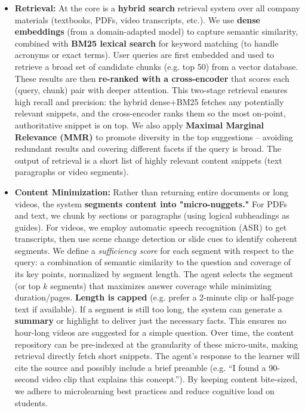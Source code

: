 \documentclass[11pt]{article}
\begin{document}
\begin{itemize}
  \item \textbf{Retrieval:} At the core is a \textbf{hybrid search} retrieval system over all company materials (textbooks, PDFs, video transcripts, etc.). We use \textbf{dense embeddings} (from a domain-adapted model) to capture semantic similarity, combined with \textbf{BM25 lexical search} for keyword matching (to handle acronyms or exact terms). User queries are first embedded and used to retrieve a broad set of candidate chunks (e.g. top 50) from a vector database. These results are then \textbf{re-ranked with a cross-encoder} that scores each (query, chunk) pair with deeper attention. This two-stage retrieval ensures high recall and precision: the hybrid dense+BM25 fetches any potentially relevant snippets, and the cross-encoder ranks them so the most on-point, authoritative snippet is on top. We also apply \textbf{Maximal Marginal Relevance (MMR)} to promote diversity in the top suggestions – avoiding redundant results and covering different facets if the query is broad. The output of retrieval is a short list of highly relevant content snippets (text paragraphs or video segments).
  \item \textbf{Content Minimization:} Rather than returning entire documents or long videos, the system \textbf{segments content into "micro-nuggets."} For PDFs and text, we chunk by sections or paragraphs (using logical subheadings as guides). For videos, we employ automatic speech recognition (ASR) to get transcripts, then use scene change detection or slide cues to identify coherent segments. We define a \textit{sufficiency score} for each segment with respect to the query: a combination of semantic similarity to the question and coverage of its key points, normalized by segment length. The agent selects the segment (or top $k$ segments) that maximizes answer coverage while minimizing duration/pages. \textbf{Length is capped} (e.g. prefer a 2-minute clip or half-page text if available). If a segment is still too long, the system can generate a \textbf{summary} or highlight to deliver just the necessary facts. This ensures no hour-long videos are suggested for a simple question. Over time, the content repository can be pre-indexed at the granularity of these micro-units, making retrieval directly fetch short snippets. The agent’s response to the learner will cite the source and possibly include a brief preamble (e.g. “I found a 90-second video clip that explains this concept.”). By keeping content bite-sized, we adhere to microlearning best practices and reduce cognitive load on students.

\end{itemize}
\end{document}
